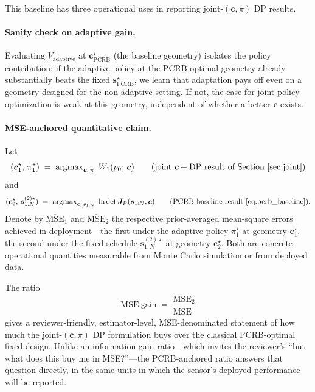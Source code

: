 \documentclass[11pt,a4paper]{article}
\newcommand{\argmax}{\operatorname{argmax}}
\begin{document}
This baseline has three operational uses in reporting joint-$(\bm{c}, \pi)$ DP results.

\paragraph{Sanity check on adaptive gain.}
Evaluating $V_{\mathrm{adaptive}}$ at $\bm{c}_{\mathrm{PCRB}}^\star$ (the baseline geometry) isolates the policy contribution: if the adaptive policy at the PCRB-optimal geometry already substantially beats the fixed $\bm{s}^\star_{\mathrm{PCRB}}$, we learn that adaptation pays off even on a geometry designed for the non-adaptive setting.  If not, the case for joint-policy optimization is weak at this geometry, independent of whether a better $\bm{c}$ exists.

\paragraph{MSE-anchored quantitative claim.}
Let
\begin{equation}
  (\bm{c}_1^\star,\, \pi_1^\star) \;=\; \argmax_{\bm{c},\,\pi}\; W_1(p_0;\, \bm{c}) \qquad\text{(joint }\bm{c}+\text{DP result of Section~\ref{sec:joint})}
\end{equation}
and
\begin{equation}
  (\bm{c}_2^\star,\, \bm{s}_{1:N}^{(2)\star}) \;=\; \argmax_{\bm{c},\,\bm{s}_{1:N}}\; \ln\det \bm{J}_P(\bm{s}_{1:N}, \bm{c}) \qquad\text{(PCRB-baseline result \eqref{eq:pcrb_baseline})}.
\end{equation}
Denote by $\overline{\mathrm{MSE}}_1$ and $\overline{\mathrm{MSE}}_2$ the respective prior-averaged mean-square errors achieved in deployment---the first under the adaptive policy $\pi_1^\star$ at geometry $\bm{c}_1^\star$, the second under the fixed schedule $\bm{s}_{1:N}^{(2)\star}$ at geometry $\bm{c}_2^\star$.  Both are concrete operational quantities measurable from Monte Carlo simulation or from deployed data.

The ratio
\begin{equation}
  \mathrm{MSE\ gain} \;=\; \frac{\overline{\mathrm{MSE}}_2}{\overline{\mathrm{MSE}}_1}
\end{equation}
gives a reviewer-friendly, estimator-level, MSE-denominated statement of how much the joint-$(\bm{c}, \pi)$ DP formulation buys over the classical PCRB-optimal fixed design.  Unlike an information-gain ratio---which invites the reviewer's ``but what does this buy me in MSE?''---the PCRB-anchored ratio answers that question directly, in the same units in which the sensor's deployed performance will be reported.
\end{document}
